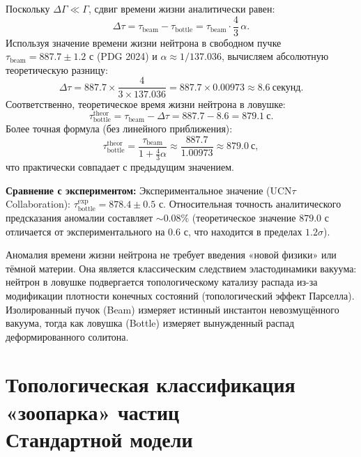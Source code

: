 \documentclass[11pt,a4paper]{article}
\begin{document}
	Поскольку $\Delta \Gamma \ll \Gamma$, сдвиг времени жизни аналитически равен:
	\begin{equation}
		\Delta \tau = \tau_{\text{beam}} - \tau_{\text{bottle}} = \tau_{\text{beam}} \cdot \frac{4}{3}\,\alpha.
	\end{equation}
	Используя значение времени жизни нейтрона в свободном пучке $\tau_{\text{beam}} = 887.7 \pm 1.2$ с (PDG 2024) и $\alpha \approx 1/137.036$, вычисляем абсолютную теоретическую разницу:
	\begin{equation}
		\Delta \tau = 887.7 \times \frac{4}{3 \times 137.036} = 887.7 \times 0.00973 \approx \mathbf{8.6\ \text{секунд}}.
	\end{equation}
	Соответственно, теоретическое время жизни нейтрона в ловушке:
	\begin{equation}
		\tau_{\text{bottle}}^{\text{theor}} = \tau_{\text{beam}} - \Delta\tau = 887.7 - 8.6 = \mathbf{879.1\ \text{с}}.
	\end{equation}
	Более точная формула (без линейного приближения):
	\begin{equation}
		\tau_{\text{bottle}}^{\text{theor}} = \frac{\tau_{\text{beam}}}{1 + \frac{4}{3}\alpha} \approx \frac{887.7}{1.00973} \approx 879.0\ \text{с},
	\end{equation}
	что практически совпадает с предыдущим значением.
	
	\textbf{Сравнение с экспериментом:}
	Экспериментальное значение (UCN$\tau$ Collaboration): $\tau_{\text{bottle}}^{\text{exp}} = 878.4 \pm 0.5$ с. Относительная точность аналитического предсказания аномалии составляет $\sim 0.08\%$ (теоретическое значение $879.0$ с отличается от экспериментального на $0.6$ с, что находится в пределах $1.2\sigma$).
	
Аномалия времени жизни нейтрона не требует введения «новой физики» или тёмной материи. Она является классическим следствием эластодинамики вакуума: нейтрон в ловушке подвергается топологическому катализу распада из-за модификации плотности конечных состояний (топологический эффект Парселла). Изолированный пучок (Beam) измеряет истинный инстантон невозмущённого вакуума, тогда как ловушка (Bottle) измеряет вынужденный распад деформированного солитона.
	
	\section{Топологическая классификация «зоопарка» частиц\\ Стандартной модели}
	
\end{document}
